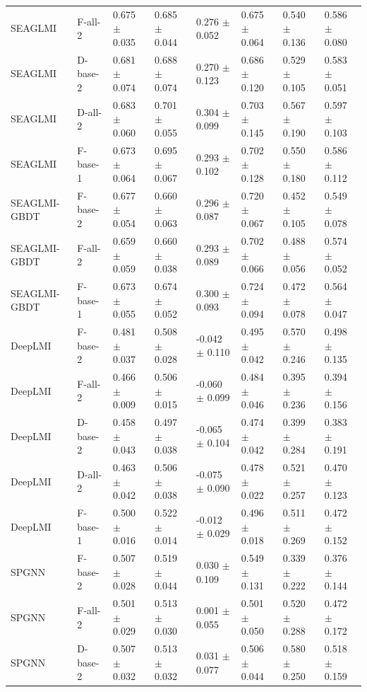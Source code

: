 \begin{landscape}
{\begin{longtable}{llllllll}
SEAGLMI & F-all-2 & 0.675 $\pm$ 0.035 & 0.685 $\pm$ 0.044 & 0.276 $\pm$ 0.052 & 0.675 $\pm$ 0.064 & 0.540 $\pm$ 0.136 & 0.586 $\pm$ 0.080 \\
SEAGLMI & D-base-2 & 0.681 $\pm$ 0.074 & 0.688 $\pm$ 0.074 & 0.270 $\pm$ 0.123 & 0.686 $\pm$ 0.120 & 0.529 $\pm$ 0.105 & 0.583 $\pm$ 0.051 \\
SEAGLMI & D-all-2 & 0.683 $\pm$ 0.060 & 0.701 $\pm$ 0.055 & 0.304 $\pm$ 0.099 & 0.703 $\pm$ 0.145 & 0.567 $\pm$ 0.190 & 0.597 $\pm$ 0.103 \\
SEAGLMI & F-base-1 & 0.673 $\pm$ 0.064 & 0.695 $\pm$ 0.067 & 0.293 $\pm$ 0.102 & 0.702 $\pm$ 0.128 & 0.550 $\pm$ 0.180 & 0.586 $\pm$ 0.112 \\
SEAGLMI-GBDT & F-base-2 & 0.677 $\pm$ 0.054 & 0.660 $\pm$ 0.063 & 0.296 $\pm$ 0.087 & 0.720 $\pm$ 0.067 & 0.452 $\pm$ 0.105 & 0.549 $\pm$ 0.078 \\
SEAGLMI-GBDT & F-all-2 & 0.659 $\pm$ 0.059 & 0.660 $\pm$ 0.038 & 0.293 $\pm$ 0.089 & 0.702 $\pm$ 0.066 & 0.488 $\pm$ 0.056 & 0.574 $\pm$ 0.052 \\
SEAGLMI-GBDT & F-base-1 & 0.673 $\pm$ 0.055 & 0.674 $\pm$ 0.052 & 0.300 $\pm$ 0.093 & 0.724 $\pm$ 0.094 & 0.472 $\pm$ 0.078 & 0.564 $\pm$ 0.047 \\
DeepLMI & F-base-2 & 0.481 $\pm$ 0.037 & 0.508 $\pm$ 0.028 & -0.042 $\pm$ 0.110 & 0.495 $\pm$ 0.042 & 0.570 $\pm$ 0.246 & 0.498 $\pm$ 0.135 \\
DeepLMI & F-all-2 & 0.466 $\pm$ 0.009 & 0.506 $\pm$ 0.015 & -0.060 $\pm$ 0.099 & 0.484 $\pm$ 0.046 & 0.395 $\pm$ 0.236 & 0.394 $\pm$ 0.156 \\
DeepLMI & D-base-2 & 0.458 $\pm$ 0.043 & 0.497 $\pm$ 0.038 & -0.065 $\pm$ 0.104 & 0.474 $\pm$ 0.042 & 0.399 $\pm$ 0.284 & 0.383 $\pm$ 0.191 \\
DeepLMI & D-all-2 & 0.463 $\pm$ 0.042 & 0.506 $\pm$ 0.038 & -0.075 $\pm$ 0.090 & 0.478 $\pm$ 0.022 & 0.521 $\pm$ 0.257 & 0.470 $\pm$ 0.123 \\
DeepLMI & F-base-1 & 0.500 $\pm$ 0.016 & 0.522 $\pm$ 0.014 & -0.012 $\pm$ 0.029 & 0.496 $\pm$ 0.018 & 0.511 $\pm$ 0.269 & 0.472 $\pm$ 0.152 \\
SPGNN & F-base-2 & 0.507 $\pm$ 0.028 & 0.519 $\pm$ 0.044 & 0.030 $\pm$ 0.109 & 0.549 $\pm$ 0.131 & 0.339 $\pm$ 0.222 & 0.376 $\pm$ 0.144 \\
SPGNN & F-all-2 & 0.501 $\pm$ 0.029 & 0.513 $\pm$ 0.030 & 0.001 $\pm$ 0.055 & 0.501 $\pm$ 0.050 & 0.520 $\pm$ 0.288 & 0.472 $\pm$ 0.172 \\
SPGNN & D-base-2 & 0.507 $\pm$ 0.032 & 0.513 $\pm$ 0.032 & 0.031 $\pm$ 0.077 & 0.506 $\pm$ 0.044 & 0.580 $\pm$ 0.250 & 0.518 $\pm$ 0.159 \\

\end{longtable}}
\end{landscape}
